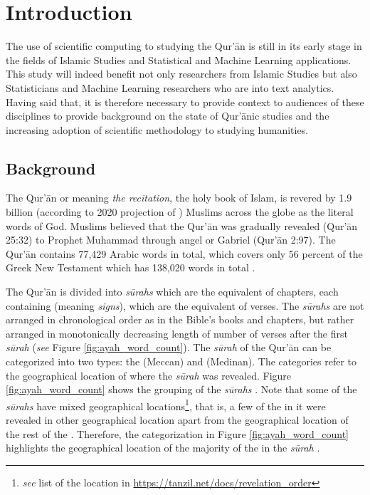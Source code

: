 \chapter{Introduction}
\label{ch:introduction}
The use of scientific computing to studying the Qur'\=an is still in its early stage in the fields of Islamic Studies and Statistical and Machine Learning applications. This study will indeed benefit not only researchers from Islamic Studies but also Statisticians and Machine Learning researchers who are into text analytics. Having said that, it is therefore necessary to provide context to audiences of these disciplines to provide background on the state of Qur'\=anic studies and the increasing adoption of scientific methodology to studying humanities.
\section{Background}
The Qur'\=an or   meaning \textit{the recitation}, the holy book of Islam, is revered by 1.9 billion (according to 2020 projection of ) Muslims across the globe as the literal words of God. Muslims believed that the Qur'\=an was gradually revealed (Qur'\=an 25:32) to Prophet Muhammad  through angel   or Gabriel (Qur'\=an 2:97). The Qur'\=an contains 77,429 Arabic words in total, which covers only 56 percent of the Greek New Testament which has 138,020 words in total \cite[p.~11]{sinai2017}. 

The Qur'\=an is divided into \textit{s\=urahs}  which are the equivalent of chapters, each containing   (meaning \textit{signs}), which are the equivalent of verses. The \textit{s\=urahs}  are not arranged in chronological order as in the Bible's books and chapters, but rather arranged in monotonically decreasing length of number of verses after the first \textit{s\=urah}  (\textit{see} Figure \ref{fig:ayah_word_count}). The \textit{s\=urah}  of the Qur'\=an can be categorized into two types: the   (Meccan) and   (Medinan). The categories refer to the geographical location of where the \textit{s\=urah}  was revealed. Figure \ref{fig:ayah_word_count} shows the grouping of the \textit{s\=urahs} . Note that some of the \textit{s\=urahs}  have mixed geographical locations\footnote{\textit{see} list of the location in \url{https://tanzil.net/docs/revelation_order}}, that is, a few of the   in it were revealed in other geographical location apart from the geographical location of the rest of the  . Therefore, the categorization in Figure \ref{fig:ayah_word_count} highlights the geographical location of the majority of the   in the \textit{s\=urah} .

